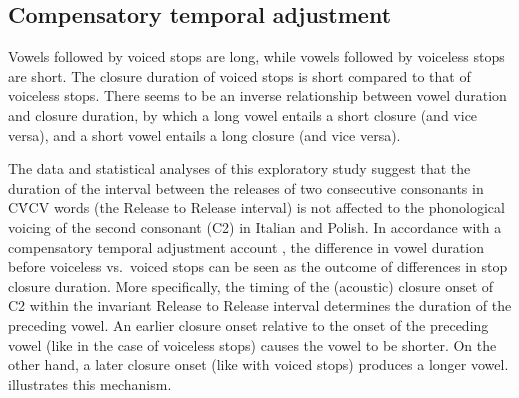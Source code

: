 \documentclass[12pt,]{article}
\begin{document}
\hypertarget{compensatory-temporal-adjustment}{%
\subsection{Compensatory temporal
adjustment}\label{compensatory-temporal-adjustment}}

Vowels followed by voiced stops are long, while vowels followed by
voiceless stops are short. The closure duration of voiced stops is short
compared to that of voiceless stops. There seems to be an inverse
relationship between vowel duration and closure duration, by which a
long vowel entails a short closure (and vice versa), and a short vowel
entails a long closure (and vice versa).

The data and statistical analyses of this exploratory study suggest that
the duration of the interval between the releases of two consecutive
consonants in CV́CV words (the Release to Release interval) is not
affected to the phonological voicing of the second consonant (C2) in
Italian and Polish. In accordance with a compensatory temporal
adjustment account \citep{slis1969, lehiste1970}, the difference in
vowel duration before voiceless vs.~voiced stops can be seen as the
outcome of differences in stop closure duration. More specifically, the
timing of the (acoustic) closure onset of C2 within the invariant
Release to Release interval determines the duration of the preceding
vowel. An earlier closure onset relative to the onset of the preceding
vowel (like in the case of voiceless stops) causes the vowel to be
shorter. On the other hand, a later closure onset (like with voiced
stops) produces a longer vowel.  illustrates this
mechanism.
\end{document}

